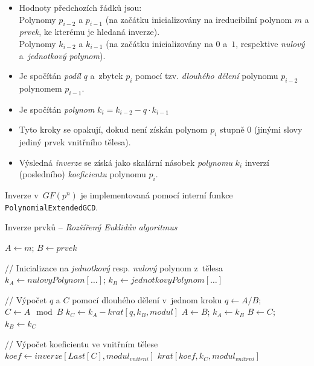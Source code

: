 \documentclass[thesis=M,czech,hidelinks]{FITthesis}[2012/06/26]
\newcommand{\0}{{\textcolor[gray]{0.75}{0}}}
\newenvironment{algoritmus}{
    \floatname{algorithm}{Algoritmus}
    \begin{algorithm}
}{\end{algorithm}}
\begin{document}
\begin{itemize}
    \item Hodnoty předchozích řádků jsou:\\
        \hspace*{0.6cm}Polynomy $p_{i-2}$ a $p_{i-1}$ (na začátku inicializovány
            na ireducibilní polynom $m$ a \emph{prvek}, ke kterému je hledaná
            inverze). \\
        \hspace*{0.6cm}Polynomy $k_{i-2}$ a $k_{i-1}$ (na začátku inicializovány
            na $0$ a~$1$, respektive \emph{nulový} a~\emph{jednotkový
            polynom}).

    \item Je spočítán \emph{podíl} $q$ a~zbytek $p_i$ pomocí tzv. \emph{dlouhého
        dělení} polynomu $p_{i-2}$ polynomem $p_{i-1}$.

    \item Je spočítán \emph{polynom} $k_i = k_{i-2} - q \cdot k_{i-1} $

    \item Tyto kroky se opakují, dokud není získán polynom $p_i$ stupně $0$
        (jinými slovy jediný prvek vnitřního tělesa).

    \item Výsledná \emph{inverze} se získá jako skalární násobek \emph{polynomu}
        $k_i$ inverzí (posledního) \emph{koeficientu} polynomu $p_i$.
\end{itemize}

Inverze v~$GF(p^n)$ je implementovaná pomocí interní funkce
\texttt{Polynomial\-ExtendedGCD}.

\begin{algoritmus}[!ht]
    \caption[Rozšířený Euklidův algoritmus]{
        Inverze prvků -- \emph{Rozšířený Euklidův algoritmus}
    }
    \begin{algorithmic}[1]
        \State $ A \gets m $; $ B \gets prvek $

        // Inicializace na \emph{jednotkový} resp. \emph{nulový} polynom z~tělesa
        \State $ k_A \gets nulovyPolynom[\ldots] $;
            $ k_B \gets jednotkovyPolynom[\ldots] $

            // Výpočet $q$ a $C$ pomocí dlouhého dělení v~jednom kroku
            \State $ q   \gets A/B $; $ C   \gets A \mod B $
            \State $ k_C \gets k_A - krat[ q, k_B, modul ] $
            \State $ A \gets B$; $k_A \gets k_B$
            \State $ B \gets C$; $k_B \gets k_C$
        \EndWhile

        // Výpočet koeficientu ve vnitřním tělese
        \State $koef \gets inverze[ Last[C], modul_{vnitrni} ]$
        \State \Return $krat[ koef, k_C, modul_{vnitrni} ]$
     \EndFunction
    \end{algorithmic}
    \label{alg_eea}
\end{algoritmus}
\end{document}
